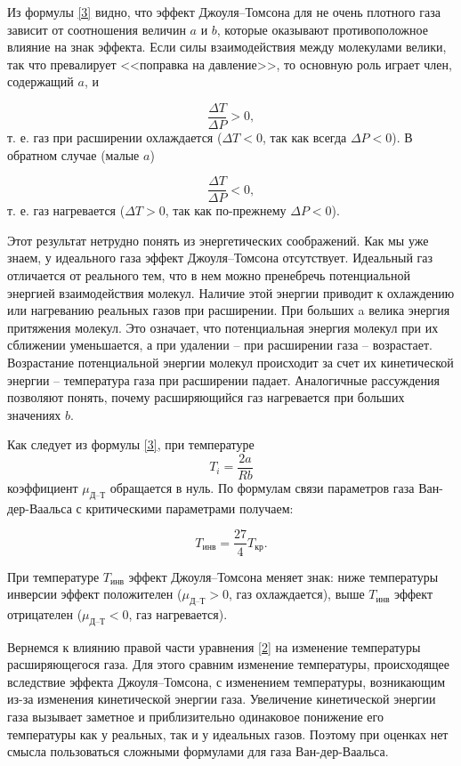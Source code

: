 \documentclass[a4paper,12pt]{article} %
\begin{document}
Из формулы \eqref{3} видно, что эффект Джоуля–Томсона для не очень плотного газа зависит от соотношения величин $ a $ и $ b $, которые оказывают противоположное влияние на знак эффекта. Если силы взаимодействия между молекулами велики, так что превалирует <<поправка на давление>>, то основную роль играет член, содержащий $ a $, и 

\[ \frac{\Delta T}{\Delta P} > 0, \]
т. е. газ при расширении охлаждается ($ \Delta T < 0 $, так как всегда $ \Delta P < 0 $). В обратном случае (малые $ a $)

\[ \frac{\Delta T}{\Delta P} < 0, \]
т. е. газ нагревается ($ \Delta T > 0 $, так как по-прежнему $ \Delta P < 0 $).

Этот результат нетрудно понять из энергетических соображений. Как мы уже знаем, у идеального газа эффект Джоуля–Томсона отсутствует. Идеальный газ отличается от реального тем, что в нем можно пренебречь потенциальной энергией взаимодействия молекул. Наличие этой энергии приводит к охлаждению или нагреванию реальных газов при расширении. При больших a велика энергия притяжения молекул. Это означает, что потенциальная энергия молекул при их сближении уменьшается, а при удалении -- при расширении газа -- возрастает. Возрастание потенциальной энергии молекул происходит за счет их кинетической энергии -- температура газа при расширении падает. Аналогичные рассуждения позволяют понять, почему расширяющийся газ нагревается при больших значениях $ b $.

Как следует из формулы \eqref{3}, при температуре \[ T_i = \frac{2a}{Rb} \] коэффициент $ \mu_\text{Д--Т} $ обращается в нуль. По формулам связи параметров газа Ван-дер-Ваальса с критическими параметрами получаем: 

\begin{equation}\label{4}
T_\text{инв} = \frac{27}{4} T_\text{кр}.
\end{equation}

При температуре $ T_\text{инв} $ эффект Джоуля–Томсона меняет знак: ниже температуры инверсии эффект положителен ($ \mu_\text{Д--Т} > 0 $, газ охлаждается), выше $ T_\text{инв} $ эффект отрицателен ($ \mu_\text{Д--Т} < 0 $, газ нагревается).

Вернемся к влиянию правой части уравнения \eqref{2} на изменение температуры расширяющегося газа. Для этого сравним изменение температуры, происходящее вследствие эффекта Джоуля–Томсона, с изменением температуры, возникающим из-за изменения кинетической энергии газа. Увеличение кинетической энергии газа вызывает заметное и приблизительно одинаковое понижение его температуры как у реальных, так и у идеальных газов. Поэтому при оценках нет смысла пользоваться сложными формулами для газа Ван-дер-Ваальса.
\end{document}
